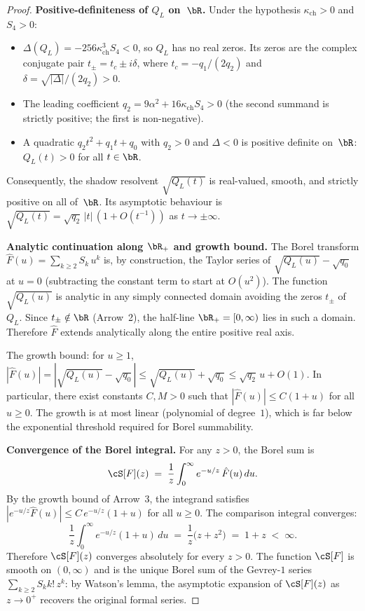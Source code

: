 \begin{proof}
\smallskip\noindent\textbf{Positive-definiteness of $Q_L$ on~$\bR$.}
Under the hypothesis $\kappa_{\mathrm{ch}} > 0$ and $S_4 > 0$:
\begin{itemize}
 \item $\Delta(Q_L) = -256\kappa_{\mathrm{ch}}^3 S_4 < 0$, so $Q_L$ has no real zeros. Its zeros are the complex conjugate pair $t_\pm = t_c \pm i\delta$, where $t_c = -q_1/(2q_2)$ and $\delta = \sqrt{|\Delta|}/(2q_2) > 0$.
 \item The leading coefficient $q_2 = 9\alpha^2 + 16\kappa_{\mathrm{ch}} S_4 > 0$ (the second summand is strictly positive; the first is non-negative).
 \item A quadratic $q_2 t^2 + q_1 t + q_0$ with $q_2 > 0$ and $\Delta < 0$ is positive definite on~$\bR$: $Q_L(t) > 0$ for all $t \in \bR$.
\end{itemize}
Consequently, the shadow resolvent $\sqrt{Q_L(t)}$ is real-valued, smooth, and strictly positive on all of~$\bR$. Its asymptotic behaviour is $\sqrt{Q_L(t)} = \sqrt{q_2}\,|t|\,(1 + O(t^{-1}))$ as $t \to \pm\infty$.

\smallskip\noindent\textbf{Analytic continuation along $\bR_+$ and growth bound.}
The Borel transform $\hat{F}(u) = \sum_{k \geq 2} S_k\, u^k$ is, by construction, the Taylor series of $\sqrt{Q_L(u)} - \sqrt{q_0}$ at $u = 0$ (subtracting the constant term to start at $O(u^2)$). The function $\sqrt{Q_L(u)}$ is analytic in any simply connected domain avoiding the zeros $t_\pm$ of~$Q_L$. Since $t_\pm \notin \bR$ (Arrow~2), the half-line $\bR_+ = [0, \infty)$ lies in such a domain. Therefore $\hat{F}$ extends analytically along the entire positive real axis.

The growth bound: for $u \geq 1$, $|\hat{F}(u)| = |\sqrt{Q_L(u)} - \sqrt{q_0}| \leq \sqrt{Q_L(u)} + \sqrt{q_0} \leq \sqrt{q_2}\, u + O(1)$. In particular, there exist constants $C, M > 0$ such that $|\hat{F}(u)| \leq C(1 + u)$ for all $u \geq 0$. The growth is at most linear (polynomial of degree~$1$), which is far below the exponential threshold required for Borel summability.

\smallskip\noindent\textbf{Convergence of the Borel integral.}
For any $z > 0$, the Borel sum is
\[
 \cS[F](z) \;=\; \frac{1}{z} \int_0^\infty e^{-u/z}\, \hat{F}(u)\, du.
\]
By the growth bound of Arrow~3, the integrand satisfies $|e^{-u/z} \hat{F}(u)| \leq C\, e^{-u/z}(1 + u)$ for all $u \geq 0$. The comparison integral converges:
\[
 \frac{1}{z}\int_0^\infty e^{-u/z}(1 + u)\, du \;=\; \frac{1}{z}\bigl(z + z^2\bigr) \;=\; 1 + z \;<\; \infty.
\]
Therefore $\cS[F](z)$ converges absolutely for every $z > 0$. The function $\cS[F]$ is smooth on $(0, \infty)$ and is the unique Borel sum of the Gevrey-$1$ series $\sum_{k \geq 2} S_k k!\, z^k$: by Watson's lemma, the asymptotic expansion of $\cS[F](z)$ as $z \to 0^+$ recovers the original formal series.


\end{proof}
